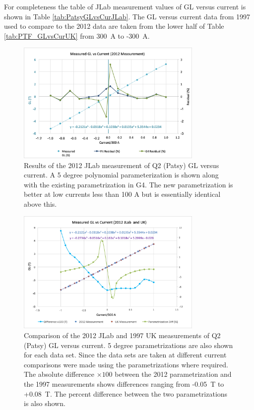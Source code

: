 \documentclass[12pt]{article}
\begin{document}
For completeness the table of JLab measurement values of GL versus current is shown in Table \ref{tab:PatsyGLvsCurJLab}. The GL versus current data from 1997 used to compare to the 2012 data are taken from the lower half of Table \ref{tab:PTF_GLvsCurUK} from 300~A to -300~A.  

\begin{figure}[!h]
\centering
\includegraphics[width=0.8\textwidth]{Patsy2012.png}
\caption{\label{fig:Patsy2012} Results of the 2012 JLab measurement of Q2 (Patsy) GL versus current. A 5 degree polynomial parameterization is shown along with the existing parametrization in G4. The new parametrization is better at low currents less than 100 A but is essentially identical above this.}
\end{figure}
\begin{figure}[!h]
\centering
\includegraphics[width=0.8\textwidth]{Patsy2012UKcomp.png}
\caption{\label{fig:Pasty2012UKcomp} Comparison of the 2012 JLab and 1997 UK measurements of Q2 (Patsy) GL versus current. 5 degree parametrizations are also shown for each data set. Since the data sets are taken at different current comparisons were made using the parametrizations where required. The absolute difference $\times100$ between the 2012 parametrization and the 1997 measurements shows differences ranging from -0.05~T to +0.08~T. The percent difference between the two parametrizations is also shown.}
\end{figure}
\end{document}
